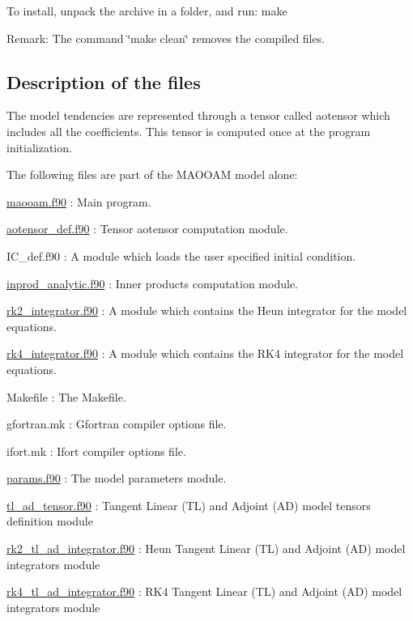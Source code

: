 To install, unpack the archive in a folder, and run\+: make

Remark\+: The command \char`\"{}make clean\char`\"{} removes the compiled files. 



\subsection*{Description of the files}

The model tendencies are represented through a tensor called aotensor which includes all the coefficients. This tensor is computed once at the program initialization.

The following files are part of the M\+A\+O\+O\+AM model alone\+:


\begin{DoxyItemize}
\item \hyperlink{maooam_8f90}{maooam.\+f90} \+: Main program.
\item \hyperlink{aotensor__def_8f90}{aotensor\+\_\+def.\+f90} \+: Tensor aotensor computation module.
\item I\+C\+\_\+def.\+f90 \+: A module which loads the user specified initial condition.
\item \hyperlink{inprod__analytic_8f90}{inprod\+\_\+analytic.\+f90} \+: Inner products computation module.
\item \hyperlink{rk2__integrator_8f90}{rk2\+\_\+integrator.\+f90} \+: A module which contains the Heun integrator for the model equations.
\item \hyperlink{rk4__integrator_8f90}{rk4\+\_\+integrator.\+f90} \+: A module which contains the R\+K4 integrator for the model equations.
\item Makefile \+: The Makefile.
\item gfortran.\+mk \+: Gfortran compiler options file.
\item ifort.\+mk \+: Ifort compiler options file.
\item \hyperlink{params_8f90}{params.\+f90} \+: The model parameters module.
\item \hyperlink{tl__ad__tensor_8f90}{tl\+\_\+ad\+\_\+tensor.\+f90} \+: Tangent Linear (TL) and Adjoint (AD) model tensors definition module
\item \hyperlink{rk2__tl__ad__integrator_8f90}{rk2\+\_\+tl\+\_\+ad\+\_\+integrator.\+f90} \+: Heun Tangent Linear (TL) and Adjoint (AD) model integrators module
\item \hyperlink{rk4__tl__ad__integrator_8f90}{rk4\+\_\+tl\+\_\+ad\+\_\+integrator.\+f90} \+: R\+K4 Tangent Linear (TL) and Adjoint (AD) model integrators module

\end{DoxyItemize}
